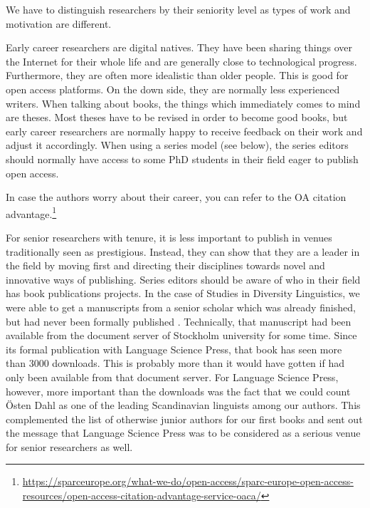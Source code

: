 \documentclass[output=guidelines,guidelines] {langscibook}
\begin{document}
We have to distinguish researchers by their seniority level as types of work and motivation are different. 

Early career researchers are digital natives. They have been sharing things over the Internet for their whole life and are generally close to technological progress. Furthermore, they are often more idealistic than older people. This is good for open access platforms. On the down side, they are normally less experienced writers. When talking about books, the things which immediately comes to mind are theses. Most theses have to be revised in order to become good books, but early career researchers are normally happy to receive feedback on their work and adjust it accordingly. When using a series model (see below), the series editors should normally have access to some PhD students in their field eager to publish open access. 

In case the authors worry about their career, you can refer to the OA citation advantage.\footnote{\url{https://sparceurope.org/what-we-do/open-access/sparc-europe-open-access-resources/open-access-citation-advantage-service-oaca/}}

For senior researchers with tenure, it is less important to publish in venues traditionally seen as prestigious. Instead, they can show that they are a leader in the field by moving first and directing their disciplines towards novel and innovative ways of publishing. 
Series editors should be aware of who in their field has book publications projects. In the case of Studies in Diversity Linguistics, we were able to get a manuscripts from a senior scholar which was already finished, but had never been formally published \citep{Dahl2016}. Technically, that manuscript had been available from the document server of Stockholm university for some time. Since its formal publication with Language Science Press, that book has seen more than 3000 downloads. This is probably more than it would have gotten if had only been available from that document server. For Language Science Press, however, more important than the downloads  was the fact that we could count Östen Dahl as one of the leading Scandinavian linguists among our authors. This complemented the list of otherwise junior authors for our first books and sent out the message that Language Science Press was to be considered as a serious venue for senior researchers as well. 
\end{document}
